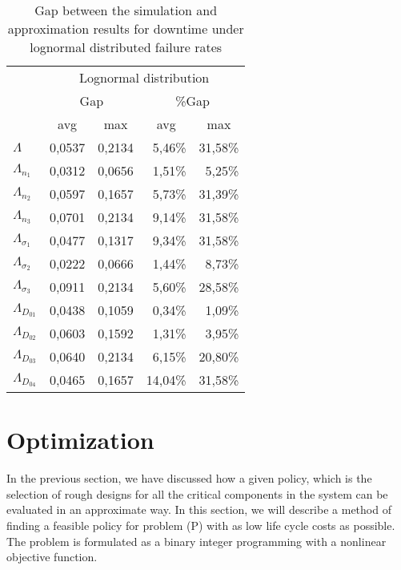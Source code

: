 \documentclass[preprint,12pt]{elsarticle}
\begin{document}
\begin{table}[htbp]
  \centering
  \caption{Gap between the simulation and approximation results for downtime under lognormal distributed failure rates}
    \begin{tabular}{lrrrr}
    \toprule
          & \multicolumn{4}{c}{Lognormal distribution} \\
          & \multicolumn{2}{c}{Gap} & \multicolumn{2}{c}{\%Gap} \\
          & \multicolumn{1}{c}{avg} & \multicolumn{1}{c}{max} & \multicolumn{1}{c}{avg} & \multicolumn{1}{c}{max} \\
 \midrule
    $\Lambda$ & 0,0537 & 0,2134 & 5,46\% & 31,58\% \\
    $\Lambda_{n_{1}}$ & 0,0312 & 0,0656 & 1,51\% & 5,25\% \\
    $\Lambda_{n_{2}}$ & 0,0597 & 0,1657 & 5,73\% & 31,39\% \\
    $\Lambda_{n_{3}}$ & 0,0701 & 0,2134 & 9,14\% & 31,58\% \\
    $\Lambda_{\sigma_{1}}$ & 0,0477 & 0,1317 & 9,34\% & 31,58\% \\
    $\Lambda_{\sigma_{2}}$ & 0,0222 & 0,0666 & 1,44\% & 8,73\% \\
    $\Lambda_{\sigma_{3}}$ & 0,0911 & 0,2134 & 5,60\% & 28,58\% \\
    $\Lambda_{D_{01}}$ & 0,0438 & 0,1059 & 0,34\% & 1,09\% \\
    $\Lambda_{D_{02}}$  & 0,0603 & 0,1592 & 1,31\% & 3,95\% \\
    $\Lambda_{D_{03}}$  & 0,0640 & 0,2134 & 6,15\% & 20,80\% \\
    $\Lambda_{D_{04}}$  & 0,0465 & 0,1657 & 14,04\% & 31,58\% \\
    \bottomrule
    \end{tabular}%
  \label{tab:lognormalgap}%
\end{table}%



\section{Optimization}

In the previous section, we have discussed how a given policy, which is the selection of rough designs for all the critical components in the system can be evaluated in an approximate way. In this section, we will describe a method of finding a feasible policy for problem (P) with as low life cycle costs as possible. The problem is formulated as a binary integer programming with a nonlinear objective function.
\end{document}
